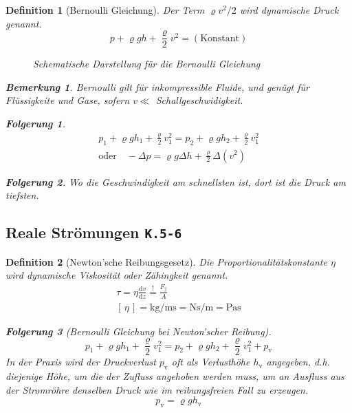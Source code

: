 \documentclass[a4paper, twocolumn]{article}
\numberwithin{equation}{section}
\theoremstyle{hsr-def}
\newtheorem{definition}{Definition}[section]
\theoremstyle{hsr-sub}
\newtheorem{result}{Folgerung}[definition]
\newtheorem{remark}{Bemerkung}[definition]
\newcommand{\dd}[1]{\ensuremath{\mathrm{d}#1}}
\newcommand{\deriv}[2]{\ensuremath{\frac{\dd{#1}}{\dd{#2}}}}
\newcommand{\unitsof}[1]{\ensuremath{\left[\,#1\,\right]}}
\newcommand{\fromlecture}[1]{\textcolor{red!70!black}{\small\texttt{K.#1}}}
\begin{document}
\begin{definition}[Bernoulli Gleichung]
Der Term \(\varrho v^2 / 2\) wird \emph{dynamische Druck} genannt.
\[
    p + \varrho g h + \frac{\varrho}{2} v^2 = (\text{Konstant})
\]

\begin{figure}[h] \centering
    \resizebox{.9\linewidth}{!}{%
    }
    \caption{Schematische Darstellung f\"ur die Bernoulli Gleichung}
\end{figure}

\begin{remark}
Bernoulli gilt f\"ur inkompressible Fluide, und gen\"ugt f\"ur Fl\"ussigkeite und Gase, sofern \(v \ll \) Schallgeschwidigkeit.
\end{remark}

\begin{result}
\begin{gather*}
    p_1 + \varrho g h_1 + \frac{\varrho}{2} v_1^2
    =
    p_2 + \varrho g h_2 + \frac{\varrho}{2} v_1^2
    \\
    \text{oder}\quad -\Delta p = \varrho g \Delta h + \frac{\varrho}{2} \Delta \left( v^2 \right)
\end{gather*}
\end{result}

\begin{result}
Wo die Geschwindigkeit am schnellsten ist, dort ist die Druck am tiefsten.
\end{result}

\end{definition}

\subsection{Reale Str\"omungen \fromlecture{5-6}}

\begin{definition}[Newton'sche Reibungsgesetz]
Die Proportionalit\"atskonstante \(\eta\) wird \emph{dynamische Viskosit\"at} oder \emph{Z\"ahingkeit} genannt.
\begin{gather*}
    \tau = \eta \deriv{v}{z}
    \stackrel{!}{=} \frac{F_\parallel}{A}  \\
    \unitsof{\eta}  
    = \si{\kilo\gram\per\metre\second}
    = \si{\newton\second\per\metre}
    = \si{\pascal\second}
\end{gather*}

\begin{result}[Bernoulli Gleichung bei Newton'scher Reibung]
\[
    p_1 + \varrho g h_1 + \frac{\varrho}{2} v_1^2
    =
    p_2 + \varrho g h_2 + \frac{\varrho}{2} v_1^2 + p_\text{v}
\]
In der Praxis wird der Druckverlust \(p_\text{v}\) oft als Verlusth\"ohe \(h_\text{v}\) angegeben, d.h. diejenige H\"ohe, um die der Zufluss angehoben werden muss, um an Ausfluss aus der Stromr\"ohre denselben Druck wie im reibungsfreien Fall zu erzeugen.
\[
    p_\text{v} = \varrho g h_\text{v}  
\]
\end{result}
\end{definition}
\end{document}
